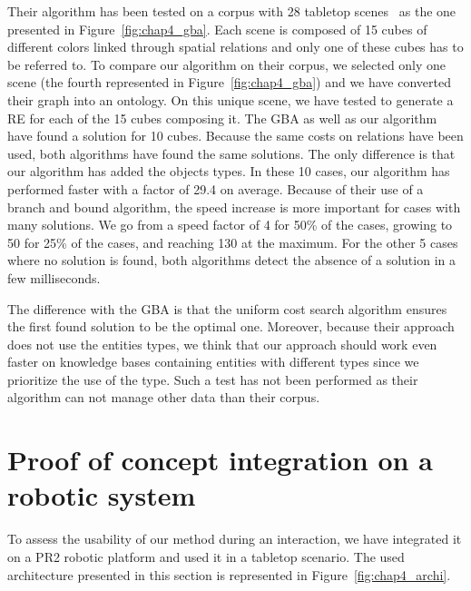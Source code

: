 Their algorithm has been tested on a corpus with 28 tabletop scenes~\cite{li_2016_spatial} as the one presented in Figure~\ref{fig:chap4_gba}. Each scene is composed of 15 cubes of different colors linked through spatial relations and only one of these cubes has to be referred to. To compare our algorithm on their corpus, we selected only one scene (the fourth represented in Figure~\ref{fig:chap4_gba}) and we have converted their graph into an ontology. On this unique scene, we have tested to generate a RE for each of the 15 cubes composing it. The GBA as well as our algorithm have found a solution for 10 cubes. Because the same costs on relations have been used, both algorithms have found the same solutions. The only difference is that our algorithm has added the objects types. In these 10 cases, our algorithm has performed faster with a factor of 29.4 on average. Because of their use of a branch and bound algorithm, the speed increase is more important for cases with many solutions. We go from a speed factor of 4 for 50\% of the cases, growing to 50 for 25\% of the cases, and reaching 130 at the maximum. For the other 5 cases where no solution is found, both algorithms detect the absence of a solution in a few milliseconds.

The difference with the GBA is that the uniform cost search algorithm ensures the first found solution to be the optimal one. Moreover, because their approach does not use the entities types, we think that our approach should work even faster on knowledge bases containing entities with different types since we prioritize the use of the type. Such a test has not been performed as their algorithm can not manage other data than their corpus.

\section[Integration on a robotic system]{Proof of concept integration on a robotic system}

To assess the usability of our method during an interaction, we have integrated it on a PR2 robotic platform and used it in a tabletop scenario. The used architecture presented in this section is represented in Figure~\ref{fig:chap4_archi}.

